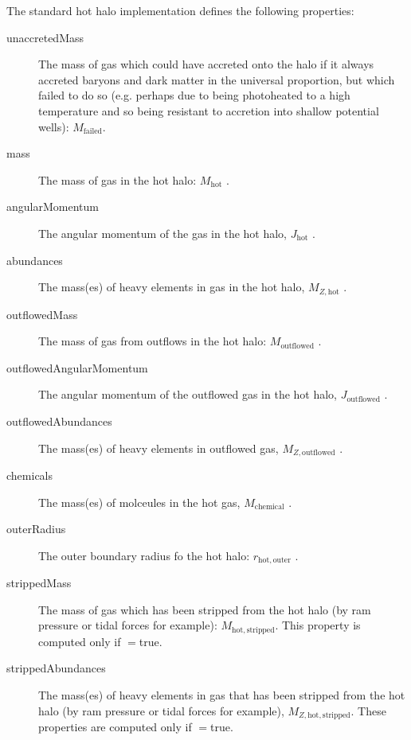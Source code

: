 The standard hot halo implementation defines the following properties:
\begin{description}
 \item [{\normalfont \ttfamily unaccretedMass}] The mass of gas which could have accreted onto the halo if it always accreted baryons and dark matter in the universal proportion, but which failed to do so (e.g. perhaps due to being photoheated to a high temperature and so being resistant to accretion into shallow potential wells): $M_\mathrm{failed}$.
 \item [{\normalfont \ttfamily mass}] The mass of gas in the hot halo: $M_\mathrm{hot}$ {\normalfont \ttfamily [hotHaloMass]}.
 \item [{\normalfont \ttfamily angularMomentum}] The angular momentum of the gas in the hot halo, $J_\mathrm{hot}$ {\normalfont \ttfamily [hotHaloAngularMomentum]}.
 \item [{\normalfont \ttfamily abundances}] The mass(es) of heavy elements in gas in the hot halo, $M_{Z, \mathrm{hot}}$ {\normalfont {}}.
 \item [{\normalfont \ttfamily outflowedMass}] The mass of gas from outflows in the hot halo: $M_\mathrm{outflowed}$ {\normalfont \ttfamily [hotHaloOutflowedMass]}.
 \item [{\normalfont \ttfamily outflowedAngularMomentum}] The angular momentum of the outflowed gas in the hot halo, $J_\mathrm{outflowed}$ {\normalfont \ttfamily [hotHaloOutflowedAngularMomentum]}.
 \item [{\normalfont \ttfamily outflowedAbundances}] The mass(es) of heavy elements in outflowed gas, $M_{Z, \mathrm{outflowed}}$ {\normalfont {}}.
 \item [{\normalfont \ttfamily chemicals}] The mass(es) of molceules in the hot gas, $M_\mathrm{chemical}$ {\normalfont {}}.
 \item [{\normalfont \ttfamily outerRadius}] The outer boundary radius fo the hot halo: $r_\mathrm{hot, outer}$ {\normalfont \ttfamily [hotHaloOuterRadius]}.
 \item [{\normalfont \ttfamily strippedMass}] The mass of gas which has been stripped from the hot halo (by ram pressure or tidal forces for example): $M_\mathrm{hot, stripped}$. This property is computed only if {\normalfont \ttfamily [hotHaloTrackStrippedGas]}$=${\normalfont \ttfamily true}.
 \item [{\normalfont \ttfamily strippedAbundances}] The mass(es) of heavy elements in gas that has been stripped from the hot halo (by ram pressure or tidal forces for example), $M_{Z, \mathrm{hot, stripped}}$. These properties are computed only if {\normalfont \ttfamily [hotHaloTrackStrippedGas]}$=${\normalfont \ttfamily true}.
\end{description}
